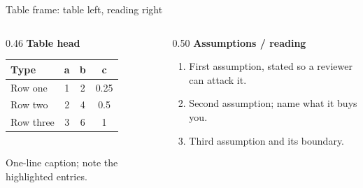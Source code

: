 \documentclass[aspectratio=169,11pt]{beamer}   %
\begin{document}
\begin{frame}{Table frame: table left, reading right}
\small
\begin{columns}[T]
\begin{column}{0.46\textwidth}
\textcolor{secondary}{\bfseries Table head}\\[1mm]
\centering
\setlength{\tabcolsep}{6pt}\renewcommand{\arraystretch}{1.2}
\begin{tabular}{@{}lccc@{}}
\toprule
Type & a & b & c \\
\midrule
Row one   & 1 & 2 & \alert{0.25} \\
Row two   & 2 & 4 & \alert{0.5} \\
Row three & 3 & 6 & 1 \\
\bottomrule
\end{tabular}\\[1.5mm]
\footnotesize One-line caption; note the \alert{highlighted} entries.
\end{column}
\begin{column}{0.50\textwidth}
\textcolor{secondary}{\bfseries Assumptions / reading}
\begin{enumerate}\setlength\itemsep{1.2mm}\footnotesize
\item First assumption, stated so a reviewer can attack it.
\item Second assumption; name what it buys you.
\item Third assumption and its boundary.
\end{enumerate}
\end{column}
\end{columns}
\end{frame}
\end{document}
